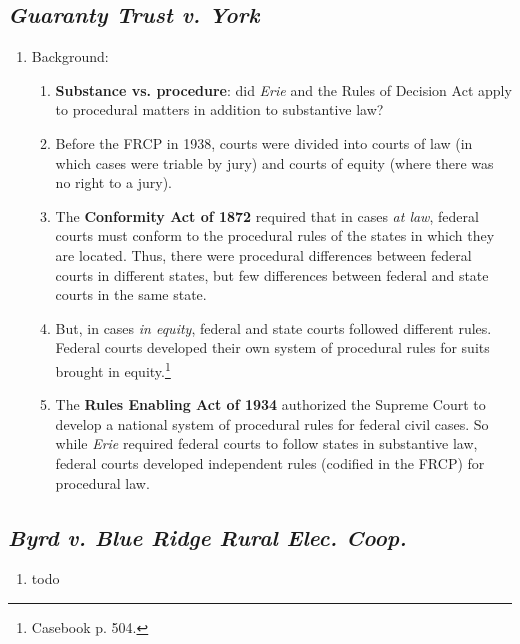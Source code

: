 \subsection{\emph{Guaranty Trust v. York}}

\begin{enumerate}
    \item Background:
    \begin{enumerate}
        \item \textbf{Substance vs. procedure}: did \emph{Erie} and the Rules of Decision Act apply to procedural matters in addition to substantive law?
        \item Before the FRCP in 1938, courts were divided into courts of law (in which cases were triable by jury) and courts of equity (where there was no right to a jury).
        \item The \textbf{Conformity Act of 1872} required that in cases \emph{at law}, federal courts must conform to the procedural rules of the states in which they are located. Thus, there were procedural differences between federal courts in different states, but few differences between federal and state courts in the same state.
        \item But, in cases \emph{in equity}, federal and state courts followed different rules. Federal courts developed their own system of procedural rules for suits brought in equity.\footnote{Casebook p. 504.}
        \item The \textbf{Rules Enabling Act of 1934} authorized the Supreme Court to develop a national system of procedural rules for federal civil cases. So while \emph{Erie} required federal courts to follow states in substantive law, federal courts developed independent rules (codified in the FRCP) for procedural law. 
    \end{enumerate}
\end{enumerate}

\subsection{\emph{Byrd v. Blue Ridge Rural Elec. Coop.}}

\begin{enumerate}
    \item todo
\end{enumerate}
